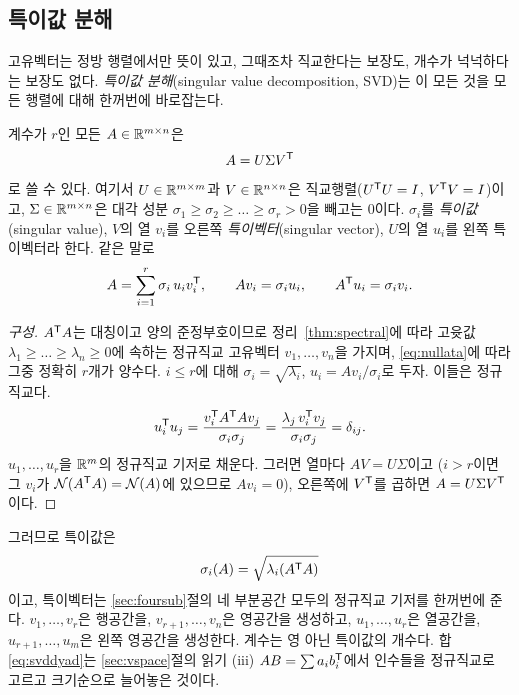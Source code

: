 \documentclass[11pt]{article}
\begin{document}
\subsection{특이값 분해}\label{sec:svdthm}
고유벡터는 정방 행렬에서만 뜻이 있고, 그때조차 직교한다는 보장도, 개수가 넉넉하다는
보장도 없다. \emph{특이값 분해}(singular value decomposition, SVD)는 이 모든 것을
모든 행렬에 대해 한꺼번에 바로잡는다.
\begin{theorem}[SVD]\label{thm:svd}
계수가 $r$인 모든 $A\in\mathbb{R}^{m\times n}$은
\[
   A = U\Sigma V^{\mathsf{T}}
\]
로 쓸 수 있다. 여기서 $U\in\mathbb{R}^{m\times m}$과 $V\in\mathbb{R}^{n\times n}$은 직교행렬($U^{\mathsf{T}} U=I$,
$V^{\mathsf{T}} V=I$)이고, $\Sigma\in\mathbb{R}^{m\times n}$은 대각 성분
$\sigma_1\ge\sigma_2\ge\dots\ge\sigma_r>0$을 빼고는 $0$이다. $\sigma_i$를
\emph{특이값}(singular value), $V$의 열 $v_i$를 오른쪽 \emph{특이벡터}(singular
vector), $U$의 열 $u_i$를 왼쪽 특이벡터라 한다. 같은 말로
\begin{equation}\label{eq:svddyad}
   A = \sum_{i=1}^{r}\sigma_i\,u_iv_i^{\mathsf{T}} ,\qquad Av_i=\sigma_iu_i,\qquad A^{\mathsf{T}} u_i=\sigma_iv_i .
\end{equation}
\end{theorem}
\begin{proof}[구성]
$A^{\mathsf{T}} A$는 대칭이고 양의 준정부호이므로 정리~\ref{thm:spectral}에 따라 고윳값
$\lambda_1\ge\dots\ge\lambda_n\ge0$에 속하는 정규직교 고유벡터 $v_1,\dots,v_n$을
가지며, \eqref{eq:nullata}에 따라 그중 정확히 $r$개가 양수다. $i\le r$에 대해
$\sigma_i=\sqrt{\lambda_i}$, $u_i=Av_i/\sigma_i$로 두자. 이들은 정규직교다.
\[
   u_i^{\mathsf{T}} u_j=\frac{v_i^{\mathsf{T}} A^{\mathsf{T}} Av_j}{\sigma_i\sigma_j}
            =\frac{\lambda_j\,v_i^{\mathsf{T}} v_j}{\sigma_i\sigma_j}=\delta_{ij}.
\]
$u_1,\dots,u_r$을 $\mathbb{R}^{m}$의 정규직교 기저로 채운다. 그러면 열마다 $AV=U\Sigma$이고
($i>r$이면 그 $v_i$가 $\mathcal N(A^{\mathsf{T}} A)=\mathcal N(A)$에 있으므로 $Av_i=0$),
오른쪽에 $V^{\mathsf{T}}$를 곱하면 $A=U\Sigma V^{\mathsf{T}}$이다.
\end{proof}
그러므로 특이값은
\[
   \sigma_i(A) = \sqrt{\lambda_i(A^{\mathsf{T}} A)}
\]
이고, 특이벡터는 \ref{sec:foursub}절의 네 부분공간 모두의 정규직교 기저를 한꺼번에
준다. $v_1,\dots,v_r$은 행공간을, $v_{r+1},\dots,v_n$은 영공간을 생성하고,
$u_1,\dots,u_r$은 열공간을, $u_{r+1},\dots,u_m$은 왼쪽 영공간을 생성한다. 계수는 영
아닌 특이값의 개수다. 합 \eqref{eq:svddyad}는 \ref{sec:vspace}절의 읽기 (iii)
$AB=\sum a_ib_i^{\mathsf{T}}$에서 인수들을 정규직교로 고르고 크기순으로 늘어놓은 것이다.
\end{document}
